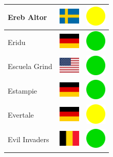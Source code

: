 \documentclass[12pt, a4paper, twoside]{report}
\begin{document}
\begin{center}
\begin{longtable}{|p{5cm}|p{2cm}|p{2cm}|}
 Ereb Altor                                                 & \includegraphics[width=1cm]{../4x3/se} &   \includegraphics[width=1cm]{../likes/m} \\ \hline
 Eridu                                                      & \includegraphics[width=1cm]{../4x3/de} &   \includegraphics[width=1cm]{../likes/y} \\ \hline
 Escuela Grind                                              & \includegraphics[width=1cm]{../4x3/us} &   \includegraphics[width=1cm]{../likes/y} \\ \hline
 Estampie                                                   & \includegraphics[width=1cm]{../4x3/de} &   \includegraphics[width=1cm]{../likes/y} \\ \hline
 Evertale                                                   & \includegraphics[width=1cm]{../4x3/de} &   \includegraphics[width=1cm]{../likes/m} \\ \hline
 Evil Invaders                                              & \includegraphics[width=1cm]{../4x3/be} &   \includegraphics[width=1cm]{../likes/y} \\ \hline

\end{longtable}
\end{center}
\end{document}
